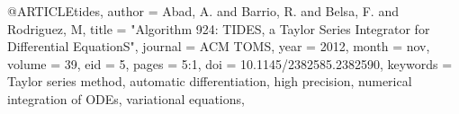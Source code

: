 
@ARTICLE{tides,
   author = {{Abad}, A. and {Barrio}, R. and {Belsa}, F. and {Rodriguez}, M},
    title = "{Algorithm 924: TIDES, a Taylor Series Integrator for Differential EquationS}",
  journal = {ACM TOMS},
     year = 2012,
    month = nov,
   volume = 39,
      eid = {5},
    pages = {5:1},
      doi = {10.1145/2382585.2382590},
 keywords = {Taylor series method, automatic differentiation, high precision, numerical integration of ODEs, variational equations},
}
